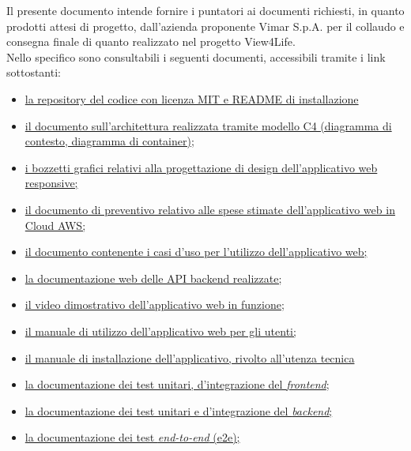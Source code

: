 \documentclass[10pt, letterpaper]{article}
\begin{document}
Il presente documento intende fornire i puntatori ai documenti richiesti, in quanto prodotti attesi di progetto,
dall'azienda proponente Vimar S.p.A. per il collaudo e consegna finale di quanto realizzato nel progetto View4Life.
\\Nello specifico sono consultabili i seguenti documenti, accessibili tramite i link sottostanti:
\begin{itemize}
    \item \href{https://github.com/SnakeByteTeam/MVP}{la repository del codice con licenza MIT e README di installazione}
    \item \href{https://github.com/SnakeByteTeam/snakebyteteam.github.io/blob/deliverables/Deliverables/Modello_C4/c4_lv1_lv2.png}{il documento sull'architettura realizzata tramite modello C4 (diagramma di contesto, diagramma di container);}
    \item \href{https://github.com/SnakeByteTeam/snakebyteteam.github.io/blob/deliverables/Deliverables/Bozzetti_grafici/bozzetti_grafici_view4life.png}{i bozzetti grafici relativi alla progettazione di design dell'applicativo web responsive;}
    \item \href{https://github.com/SnakeByteTeam/snakebyteteam.github.io/blob/deliverables/Deliverables/Preventivo_spese_AWS/Preventivo_AWS.pdf}{il documento di preventivo relativo alle spese stimate dell'applicativo web in Cloud AWS;}
    \item \href{https://github.com/SnakeByteTeam/snakebyteteam.github.io/blob/deliverables/Deliverables/Analisi_dei_requisiti/Analisi_dei_Requisiti_v2.0.0.pdf}{il documento contenente i casi d'uso per l'utilizzo dell'applicativo web;}
    \item \href{https://view4life.me/api/docs}{la documentazione web delle API backend realizzate;}
    \item \href{https://drive.google.com/file/d/1wXBJG6PSTtiJdZtN-cWsxHKskaXdRu2f/view?usp=sharing}{il video dimostrativo dell'applicativo web in funzione;}
    \item \href{https://github.com/SnakeByteTeam/snakebyteteam.github.io/blob/deliverables/Deliverables/Manuale_utente/Manuale_utente_v1.0.0.pdf}{il manuale di utilizzo dell'applicativo web per gli utenti;}
    \item \href{https://github.com/SnakeByteTeam/snakebyteteam.github.io/blob/deliverables/3-PB/Documenti_esterni/Manuale_installazione/Manuale_installazione_v1.0.0.pdf}{il manuale di installazione dell'applicativo, rivolto all'utenza tecnica}
    \item \href{https://github.com/SnakeByteTeam/snakebyteteam.github.io/blob/deliverables/Deliverables/test_report/frontend/frontend_tests_all.pdf}{la documentazione dei test unitari, d'integrazione del \textit{frontend};}
    \item \href{https://github.com/SnakeByteTeam/snakebyteteam.github.io/blob/deliverables/Deliverables/test_report/backend/backend_tests_all.pdf}{la documentazione dei test unitari e d'integrazione del \textit{backend};}
    \item \href{https://github.com/SnakeByteTeam/snakebyteteam.github.io/blob/deliverables/Deliverables/test_report/e2e/e2e_tests_coverage.pdf}{la documentazione dei test \textit{end-to-end} (e2e);}

\end{itemize}
\end{document}
